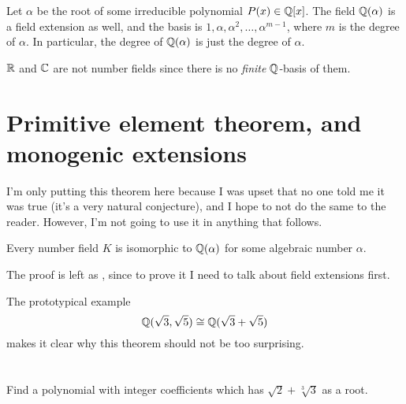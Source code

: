 \begin{example}
	Let $\alpha$ be the root of some irreducible polynomial $P(x) \in \mathbb Q[x]$.
	The field $\mathbb Q(\alpha)$ is a field extension as well, and the basis
	is $1, \alpha, \alpha^2, \dots, \alpha^{m-1}$,
	where $m$ is the degree of $\alpha$.
	In particular, the degree of $\mathbb Q(\alpha)$ is just the degree of $\alpha$.
\end{example}
\begin{example}
	$\mathbb R$ and $\mathbb C$ are not number fields since there is no \emph{finite}
	$\mathbb Q$-basis of them.
\end{example}

\section{Primitive element theorem, and monogenic extensions}

I'm only putting this theorem here because I was upset that no one
told me it was true (it's a very natural conjecture),
and I hope to not do the same to the reader.
However, I'm not going to use it in anything that follows.

\begin{theorem}
	Every number field $K$ is isomorphic to $\mathbb Q(\alpha)$
	for some algebraic number $\alpha$.
	\label{thm:artin_primitive_elm}
\end{theorem}
The proof is left as , since to prove it I need to talk
about field extensions first.

The prototypical example \[ \mathbb Q(\sqrt3,\sqrt5) \cong \mathbb Q(\sqrt3+\sqrt5) \]
makes it clear why this theorem should not be too surprising.

\section{\problemhead}

\begin{problem}
	Find a polynomial with integer coefficients
	which has $\sqrt2+\sqrt[3]{3}$ as a root.
\end{problem}

